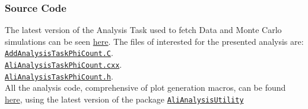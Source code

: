\subsubsection{Source Code}
The latest version of the Analysis Task used to fetch Data and Monte Carlo simulations can be seen \href{https://github.com/alisw/AliPhysics/tree/master/PWGLF/RESONANCES/extra}{here}. The files of interested for the presented analysis are:\\
\href{https://github.com/alisw/AliPhysics/blob/master/PWGLF/RESONANCES/extra/AddAnalysisTaskPhiCount.C}{\texttt{AddAnalysisTaskPhiCount.C}}.\\
\href{https://github.com/alisw/AliPhysics/blob/master/PWGLF/RESONANCES/extra/AliAnalysisTaskPhiCount.cxx}{\texttt{AliAnalysisTaskPhiCount.cxx}}.\\
\href{https://github.com/alisw/AliPhysics/blob/master/PWGLF/RESONANCES/extra/AliAnalysisTaskPhiCount.h}{\texttt{AliAnalysisTaskPhiCount.h}}.\\
\indent All the analysis code, comprehensive of plot generation macros, can be found \href{https://github.com/Nikolajal/AliAnalysisPhiCount}{here}, using the latest version of the package \href{https://github.com/Nikolajal/AliAnalysisUtility.git}{\texttt{AliAnalysisUtility}}


